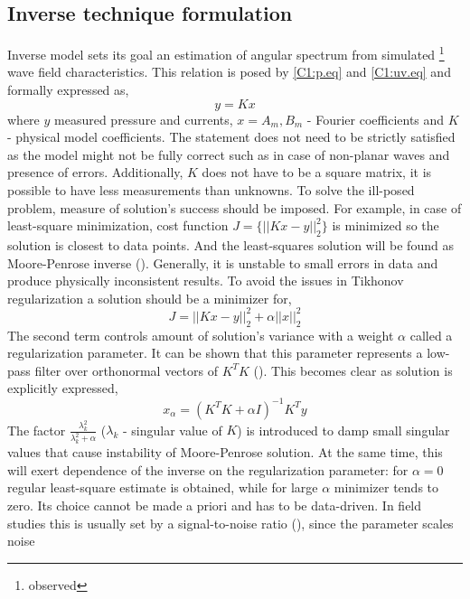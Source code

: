 \subsection{Inverse technique formulation}
Inverse model sets its goal an estimation of angular spectrum from simulated \footnote{observed} 
wave field characteristics. This relation is posed by \eqref{C1:p.eq} and \eqref{C1:uv.eq} and 
formally expressed as,
\begin{equation}
y = K x
\end{equation}
where $y$ measured pressure and currents, $x = {A_m, B_m}$ - Fourier coefficients and $K$ - 
physical model coefficients. The statement does not need to be strictly satisfied as the model 
might not be fully correct such as in case of non-planar waves and presence of errors. 
Additionally, $K$ does not have to be a square matrix, it is possible to have less measurements 
than unknowns. To solve the ill-posed problem, measure of solution's success should be imposed. For 
example, in case of least-square minimization, cost function $J = \{ ||K x - y||^2_2 \}$ is 
minimized so the solution is closest to data points. And the least-squares solution  
will be found as Moore-Penrose inverse (\cite{bennett1992inverse}). Generally, it is unstable to 
small errors in data and produce physically inconsistent results. To avoid the issues in Tikhonov 
regularization a solution should be a minimizer for,
\begin{equation}
\label{C1:Tikh_prob}
J = ||K x - y||^2_2 + \alpha ||x||^2_2
\end{equation}
The second term controls amount of solution's variance with a weight $\alpha$ called a regularization parameter. It can be shown that this parameter represents a low-pass filter over orthonormal vectors of $K^TK$ (\cite{williams2001regularization}). This becomes clear as solution is explicitly expressed,
\begin{equation}
\label{C1:Tikh_solution}
x_{\alpha} = (K^T K + \alpha I)^{-1} K^T y
\end{equation}
The factor $\frac{\lambda_k^2}{\lambda_k^2 + \alpha}$ ($\lambda_k$ - singular value of $K$) 
is introduced to damp small singular values that cause instability of Moore-Penrose solution. 
At the same time, this will exert dependence of the inverse on the regularization parameter: for 
$\alpha = 0$ regular least-square estimate is obtained, while for large $\alpha$ minimizer tends to 
zero. Its choice cannot be made a priori and has to be data-driven. In field studies this is 
usually set by a signal-to-noise ratio (\cite{munk2009ocean}), since the parameter scales noise 
